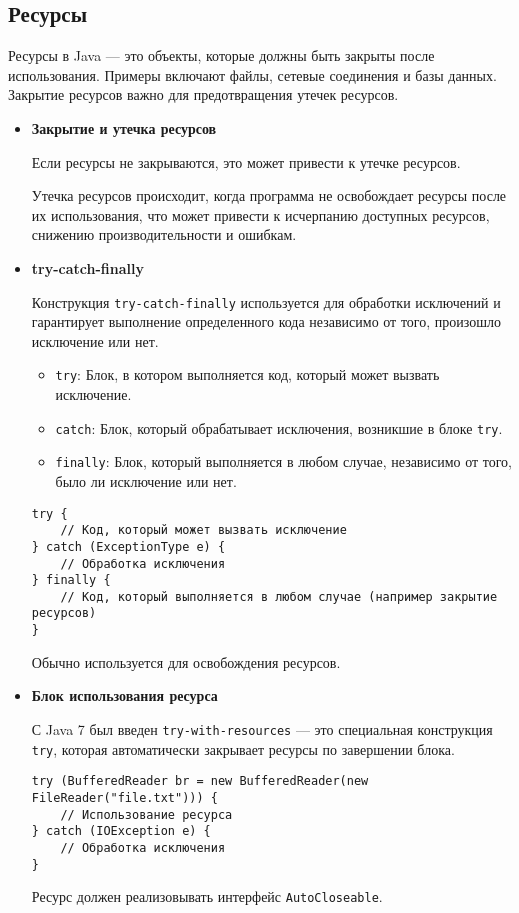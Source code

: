 \subsection{Ресурсы}
Ресурсы в Java — это объекты, которые должны быть закрыты после использования. Примеры включают файлы, сетевые соединения и базы данных. Закрытие ресурсов важно для предотвращения утечек ресурсов.

\begin{itemize}
    \item \textbf{Закрытие и утечка ресурсов} \par
    Если ресурсы не закрываются, это может привести к утечке ресурсов. \par Утечка ресурсов происходит, когда программа не освобождает ресурсы после их использования, что может привести к исчерпанию доступных ресурсов, снижению производительности и ошибкам.

    \item \textbf{try-catch-finally} \par
    Конструкция \texttt{try-catch-finally} используется для обработки исключений и гарантирует выполнение определенного кода независимо от того, произошло исключение или нет.

    \begin{itemize}
        \item \texttt{try}: Блок, в котором выполняется код, который может вызвать исключение.
        \item \texttt{catch}: Блок, который обрабатывает исключения, возникшие в блоке \texttt{try}.
        \item \texttt{finally}: Блок, который выполняется в любом случае, независимо от того, было ли исключение или нет. 
    \end{itemize}
    \begin{verbatim}
try {
    // Код, который может вызвать исключение
} catch (ExceptionType e) {
    // Обработка исключения
} finally {
    // Код, который выполняется в любом случае (например закрытие ресурсов)
}
    \end{verbatim}
    Обычно используется для освобождения ресурсов.

    \item \textbf{Блок использования ресурса} \par
    С Java 7 был введен \texttt{try-with-resources} — это специальная конструкция \texttt{try}, которая автоматически закрывает ресурсы по завершении блока.
    \begin{verbatim}
try (BufferedReader br = new BufferedReader(new FileReader("file.txt"))) {
    // Использование ресурса
} catch (IOException e) {
    // Обработка исключения
}
    \end{verbatim}
    Ресурс должен реализовывать интерфейс \texttt{AutoCloseable}.


\end{itemize}
